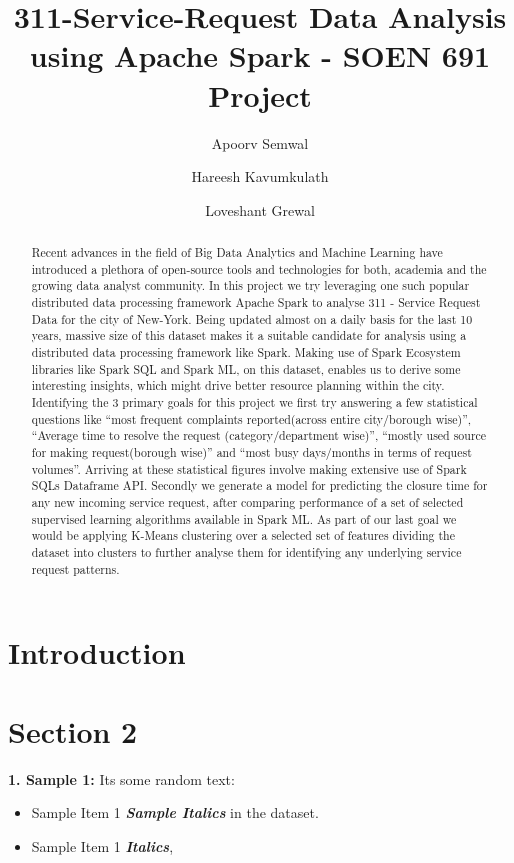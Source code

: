 \documentclass[10pt,twocolumn,letterpaper]{article}
\begin{document}
\title{311-Service-Request Data Analysis using Apache Spark - SOEN 691 Project}
\author{Apoorv Semwal \and Hareesh Kavumkulath \and Loveshant Grewal}
\maketitle

\begin{abstract}
Recent advances in the field of Big Data Analytics and Machine Learning have introduced a plethora of open-source tools and technologies for both, 
academia and the growing data analyst community. In this project we try leveraging one such popular distributed data processing framework Apache Spark
to analyse 311 - Service Request Data for the city of New-York. Being updated almost on a daily basis for the last 10 years, massive size of this dataset makes it a suitable candidate for analysis using a distributed data processing framework like Spark. Making use of Spark Ecosystem libraries like Spark SQL and Spark ML, on this dataset, enables us to derive some interesting insights, which might drive better resource planning within the city. Identifying the 3 primary goals for this project we first try answering a few statistical questions like “most frequent complaints reported(across entire city/borough wise)”, “Average time to resolve the request (category/department wise)”, “mostly used source for making request(borough wise)” and “most busy days/months in terms of request volumes”.
Arriving at these statistical figures involve making extensive use of Spark SQLs Dataframe API. Secondly we generate a model for predicting the closure time for any new incoming service request, after comparing performance of a set of selected supervised learning algorithms available in Spark ML. As part of our last goal we would be applying K-Means clustering over a selected set of features dividing the dataset into clusters to further analyse them for identifying any underlying service request patterns.
\end{abstract}

\section{Introduction}

\section{Section 2}

\textbf{1. Sample 1:} Its some random text:
\begin{itemize}
  \item Sample Item 1 \textbf{{\em Sample Italics}} in the dataset.
  \item Sample Item 1 \textbf{{\em Italics}}, 
\end{itemize}
\end{document}
